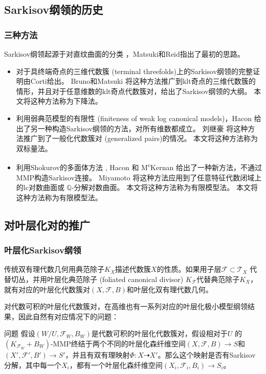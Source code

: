\documentclass[10pt]{ctexbeamer}
\begin{document}
\subsection{Sarkisov纲领的历史}\label{subsec:1-2}
\begin{frame}[shrink]
  \frametitle{三种方法}
Sarkisov纲领起源于对直纹曲面的分类 \cite{sarkisovBIRATIONALAUTOMORPHISMSCONIC1981,sarkisovCONICBUNDLESTRUCTURES1983}，Matsuki和Reid指出了最初的思路。
  \begin{itemize}
    \pause
    \item 
对于具终端奇点的三维代数簇 (terminal threefolds)上的Sarkisov纲领的完整证明由Corti\cite{cortiFactoringBirationalMaps}给出。 
Bruno和Matsuki \cite{brunoLogSarkisovProgram1995} 将这种方法推广到klt奇点的三维代数簇的情形，并且对于任意维数的klt奇点代数簇对，给出了Sarkisov纲领的大纲。
本文将这种方法称为\alert{下降法}。
    \pause
    \item 
利用弱典范模型的有限性\cite{BCHM10} (finiteness of weak log canonical models)，Hacon \cite{haconMinimalModelProgram2012} 给出了另一种构造Sarkisov纲领的方法，对所有维数都成立。
刘继豪 \cite{liuSarkisovProgramGeneralized2021} 将这种方法推广到了一般化代数簇对 (generalized pairs)的情况。
本文将这种方法称为\alert{双标量法}。
    \pause
    \item 
利用Shokurov的多面体方法 \cite{Sho96,cs11}, Hacon 和 M\textsuperscript{c}Kernan \cite{haconSarkisovProgram2012}给出了一种新方法，不通过MMP构造Sarkisov连接。
Miyamoto \cite{miyamoto2019TheSP} 将这种方法应用到了任意特征代数闭域上的lc对数曲面或 $\mathbb{Q}$-分解对数曲面。 本文将这种方法称为有限模型法。
本文将这种方法称为\alert{有限模型法}。
  \end{itemize}
\end{frame}  



\subsection{对叶层化对的推广}
\begin{frame}[shrink]
  \frametitle{叶层化Sarkisov纲领}
传统双有理代数几何用典范除子$K_{X}$描述代数簇$X$的性质。如果用子层$\mathcal{F} \subset \mathcal{T}_{X}$ 代替切丛，并用叶层化典范除子 (foliated canonical divisor) $K_{\mathcal{F}}$代替典范除子$K_{X}$，就有对应的叶层化代数簇对$(X,\mathcal{F},B)$和叶层化双有理代数几何。


    \pause
对代数可积的叶层化代数簇对，在高维也有一系列对应的叶层化极小模型纲领结果，因此自然有对应情况下的问题：

\begin{block}{问题}
假设$(W/U,\mathcal{F}_{W},B_{W})$是代数可积的叶层化代数簇对，假设相对于$U$ 的 $(K_{\mathcal{F}_{W}}+B_{W})$-MMP终结于两个不同的叶层化森纤维空间$(X,\mathcal{F},B)\to S$和$(X',\mathcal{F}',B')\to S'$，并且有双有理映射$\Phi:X \dashrightarrow X'$。那么这个映射是否有Sarkisov分解，其中每一个$X_{i}$，都有一个叶层化森纤维空间$(X_{i},\mathcal{F}_{i},B_{i})\to S_{i}$。
\end{block}
\end{frame}
\end{document}
